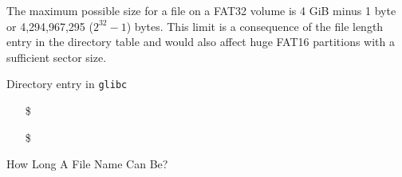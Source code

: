 The maximum possible size for a file on a FAT32 volume is 4 GiB minus 1 byte or
4,294,967,295 ($2^{32} − 1$) bytes. This limit is a consequence of the file length entry
in the directory table and would also affect huge FAT16 partitions with a sufficient
sector size.

\begin{frame}%
  \begin{block}{Directory entry in \texttt{glibc}}
  \end{block}
  \begin{itemize}
  \item[\$] 
  \item[\$] 
  \end{itemize}
\end{frame}

\begin{frame}{How Long A File Name Can Be?}
  \begin{center}\label{fig:filename}
    \mode<beamer>{ \texttt{[image: 04-15]} }%
  \end{center}
\end{frame}


